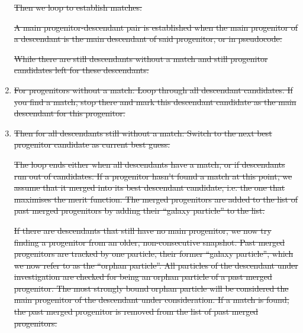 \documentclass[a4paper,twocolumn,fleqn,usenatbib]{mnras}
\providecommand{\DIFdel}[1]{{\protect\color{red}\sout{#1}}}                      %
\begin{document}
\begin{enumerate}
\DIFdel{Then we loop to establish matches:
		}%

\DIFdel{A main progenitor-descendant pair is established when the main progenitor of a descendant is the main descendant of said progenitor, or in pseudocode:
		}%

\DIFdel{While there are still descendants without a match and still progenitor candidates left for these descendants:
		}%


\item %
\DIFdel{For progenitors without a match: Loop through all descendant candidates. 
					If you find a match, stop there and mark this descendant candidate as the main descendant for this progenitor.
			}%

\item %
\DIFdel{Then for all descendants still without a match: Switch to the next best progenitor candidate as current best guess.
			}%


\DIFdel{The loop ends either when all descendants have a match, or if descendants run out of candidates.
		If a progenitor hasn't found a match at this point, we assume that it merged into its best descendant candidate, i.e. the one that maximises the merit function.
	  The merged progenitors are added to the list of past merged progenitors by adding their ``galaxy particle'' to the list.
		}%

\DIFdel{If there are descendants that still have no main progenitor, we now try finding a progenitor from an older, non-consecutive snapshot.
		Past merged progenitors are tracked by one particle, their former ``galaxy particle'', which we now refer to as the ``orphan particle''.
		All particles of the descendant under investigation are checked for being an orphan particle of a past merged progenitor.
		The most strongly bound orphan particle will be considered the main progenitor of the descendant under consideration.
		If a match is found, the past merged progenitor is removed from the list of past merged progenitors.
		}%


\end{enumerate}
\end{document}
